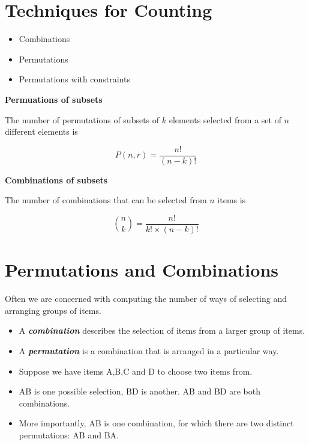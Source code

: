 {%

\section{Techniques for Counting}


\begin{itemize}
	\item Combinations
	\item Permutations
	\item Permutations with constraints
\end{itemize}




\noindent \textbf{Permuations of subsets}

The number of permutations of subsets of $k$ elements selected from a set of $n$ different elements is

\[P(n,r) = \frac{n!}{(n-k)!}  \]



\noindent \textbf{Combinations of subsets}

The number of combinations that can be selected from $n$ items is

\[ {n \choose k} = \frac{n!}{k! \times (n-k)!}  \]






	\section{Permutations and Combinations}
	
	
	Often we are concerned with computing the number of ways of selecting and arranging groups of items. \begin{itemize} \item  A \textbf{\emph{combination}} describes the selection of items from a larger group of items.  \item A \textbf{\emph{permutation}} is a combination that is arranged in a particular way.
	\end{itemize}

	\begin{itemize}
		\item Suppose we have items A,B,C and D to choose two items from.
		\item AB is one possible selection, BD is another. AB and BD are both combinations.
		\item More importantly, AB is one combination, for which there are two distinct permutations: AB and BA.
	\end{itemize}

}
